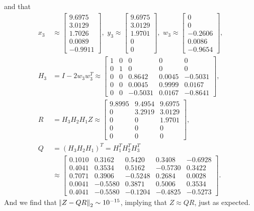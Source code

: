\documentclass[11pt]{article}
\begin{document}
and that 
\begin{equation}\begin{split} 
x_3 &\approx
\begin{bmatrix} 9.6975 \\ 3.0129 \\ 1.7026 \\ 0.0089 \\ -0.9911\end{bmatrix},\,\,
y_3 \approx \begin{bmatrix} 
9.6975 \\ 3.0129 \\ 1.9701 \\ 0 \\ 0
\end{bmatrix},\,\,
w_3 \approx \begin{bmatrix} 0 \\ 0 \\ -0.2606 \\ 0.0086 \\ -0.9654\end{bmatrix}, \\
H_3 &= I - 2w_3w_3^T \approx 
\begin{bmatrix} 
1 & 0 & 0 & 0 & 0\\
0 & 1 & 0 & 0 & 0 \\
0 & 0 & 0.8642 & 0.0045 & -0.5031 \\
0 & 0 & 0.0045 & 0.9999 & 0.0167 \\
0 & 0 & -0.5031 & 0.0167 & -0.8641
\end{bmatrix},\\
R &= H_3H_2 H_1Z \approx
\begin{bmatrix} 
9.8995 & 9.4954 & 9.6975 \\
0 & 3.2919 & 3.0129 \\
0 & 0 & 1.9701 \\
0 & 0 & 0\\
0 & 0 & 0
\end{bmatrix},\\
Q &= (H_3H_2H_1)^T = H_1^TH_2^TH_3^T\\
&\approx
\begin{bmatrix} 
0.1010 & 0.3162 & 0.5420 & 0.3408 & -0.6928 \\
0.4041 & 0.3534 & 0.5162 & -0.5730 & 0.3422\\
0.7071 & 0.3906 & -0.5248 & 0.2684 & 0.0028\\
0.0041 & -0.5580 & 0.3871 & 0.5006 & 0.3534\\
0.4041 & -0.5580 & -0.1204 & -0.4825 & -0.5273
\end{bmatrix}.
\end{split}\nonumber\end{equation} 
And we find that $\norm{Z-QR}_2 \sim 10^{-15}$, implying that $Z\approx QR$, just as expected.
\end{document}

